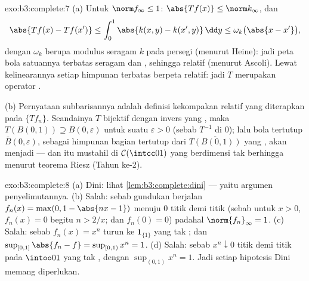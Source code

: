 \begin{solution}{exo:b3:complete:7}
(a) Untuk $\norm f_\infty \leq 1$: $\abs{Tf(x)} \leq
\norm k_\infty$, dan
\[
\abs{Tf(x) - Tf(x')} \leq \int_0^1\abs{k(x,y) -
k(x',y)}\,\dd y \leq \omega_k\bigl(\abs{x - x'}\bigr),
\]
dengan $\omega_k$ berupa modulus  seragam $k$ pada
persegi  (menurut Heine): jadi peta bola satuannya
terbatas seragam dan , sehingga  relatif
(menurut Ascoli). Lewat kelinearannya setiap himpunan terbatas berpeta 
relatif: jadi $T$ merupakan operator .

(b) Pernyataan subbarisannya adalah definisi kekompakan
relatif yang diterapkan pada $\{Tf_n\}$. Seandainya $T$ bijektif dengan
invers yang , maka $T(B(0,1)) \supseteq B(0,
\varepsilon)$ untuk suatu $\varepsilon > 0$ (sebab $T^{-1}$ 
di $0$); lalu bola tertutup $\bar B(0,\varepsilon)$, sebagai himpunan bagian
tertutup dari $\overline{T(B(0,1))}$ yang , akan menjadi 
--- dan itu mustahil di $\mathcal C(\intcc01)$ yang berdimensi tak
berhingga menurut teorema Riesz (Tahun ke-2).
\end{solution}

\begin{solution}{exo:b3:complete:8}
(a) Dini: lihat \cref{lem:b3:complete:dini} --- yaitu argumen
penyelimutannya. (b) Salah: sebab gundukan berjalan $f_n(x) = \max(0, 1 -
\abs{nx - 1})$ menuju $0$ titik demi titik (sebab untuk $x > 0$, $f_n(x) =
0$ begitu $n > 2/x$; dan $f_n(0) = 0$) padahal $\norm{f_n}_\infty = 1$.
(c) Salah: sebab $f_n(x) = x^n$ turun ke $\mathbf 1_{\{1\}}$ yang tak
; dan $\sup_{[0,1]}\abs{f_n - f} = \sup_{[0,1)}
x^n = 1$. (d) Salah: sebab $x^n \downarrow 0$ titik demi titik pada
$\intoo01$ yang tak , dengan $\sup_{(0,1)}x^n = 1$. Jadi setiap
hipotesis Dini memang diperlukan.
\end{solution}

